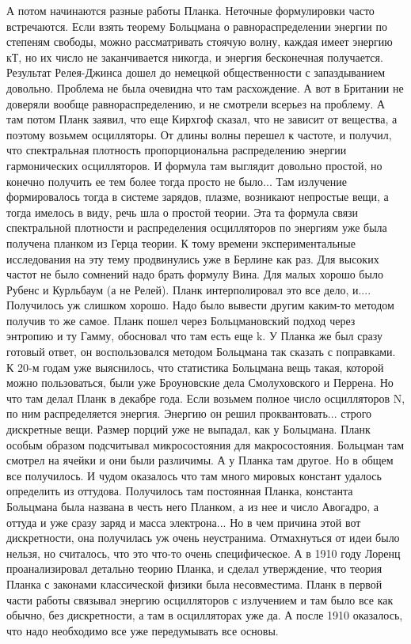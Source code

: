 \documentclass[a4paper, 12pt]{article}
\begin{document}
А потом начинаются разные работы Планка. Неточные формулировки часто 
встречаются. Если взять теорему Больцмана о равнораспределении энергии 
по степеням свободы, можно рассматривать стоячую волну, каждая имеет 
энергию кТ, но их число не заканчивается никогда, и энергия бесконечная 
получается. Результат Релея-Джинса дошел до немецкой общественности 
с запаздыванием довольно. Проблема не была очевидна что там расхождение. 
А вот в Британии не доверяли вообще равнораспределению, и не смотрели 
всерьез на проблему. А там потом Планк заявил, что еще Кирхгоф сказал, 
что не зависит от вещества, а поэтому возьмем осцилляторы. От длины 
волны перешел к частоте, и получил, что спектральная плотность 
пропорциональна распределению энергии гармонических осцилляторов. 
И формула там выглядит довольно простой, но конечно получить ее тем 
более тогда просто не было... Там излучение формировалось тогда 
в системе зарядов, плазме, возникают непростые вещи, а тогда имелось 
в виду, речь шла о простой теории. Эта та формула связи спектральной 
плотности и распределения осцилляторов по энергиям уже была получена 
планком из Герца теории. К тому времени экспериментальные исследования 
на эту тему продвинулись уже в Берлине как раз. Для высоких частот не 
было сомнений надо брать формулу Вина. Для малых хорошо было Рубенс 
и Курльбаум (а не Релей). Планк интерполировал это все дело, и.... 
Получилось уж слишком хорошо. Надо было вывести другим каким-то методом 
получив то же самое. Планк пошел через Больцмановский подход через 
энтропию и ту Гамму, обосновал что там есть еще k. У Планка же был сразу 
готовый ответ, он воспользовался методом Больцмана так сказать 
с поправками. К 20-м годам уже выяснилось, что статистика Больцмана вещь 
такая, которой можно пользоваться, были уже Броуновские дела 
Смолуховского и Перрена. Но что там делал Планк в декабре года. Если 
возьмем полное число осцилляторов N, по ним распределяется энергия. 
Энергию он решил проквантовать... строго дискретные вещи. Размер порций 
уже не выпадал, как у Больцмана. Планк особым образом подсчитывал 
микросостояния для макросостояния. Больцман там смотрел на ячейки и они 
были различимы. А у Планка там другое. Но в общем все получилось. 
И чудом оказалось что там много мировых констант удалось определить из 
оттудова. Получилось там постоянная Планка, константа Больцмана была 
названа в честь него Планком, а из нее и число Авогадро, а оттуда и уже 
сразу заряд и масса электрона... Но в чем причина этой вот дискретности, 
она получилась уж очень неустранима. Отмахнуться от идеи было нельзя, но 
считалось, что это что-то очень специфическое. А в 1910 году Лоренц 
проанализировал детально теорию Планка, и сделал утверждение, что теория 
Планка с законами классической физики была несовместима. Планк в первой 
части работы связывал энергию осцилляторов с излучением и там было все 
как обычно, без дискретности, а там в осцилляторах уже да. А после 1910 
оказалось, что надо необходимо все уже передумывать все основы.
\end{document}
